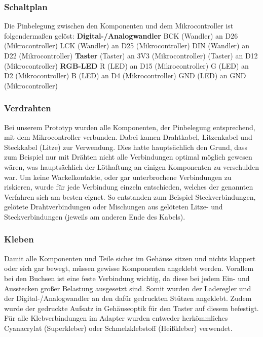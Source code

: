 \documentclass[]{article}
\begin{document}
\subsubsection{Schaltplan}
Die Pinbelegung zwischen den Komponenten und dem Mikrocontroller ist folgendermaßen gelöst:
\vspace{4mm}\newline
\textbf{Digital-/Analogwandler} \newline
BCK (Wandler) an D26 (Mikrocontroller)\newline
LCK (Wandler) an D25 (Mikrocontroller)\newline
DIN (Wandler) an D22 (Mikrocontroller)\newline
\vspace{4mm}\newline
\textbf{Taster}  (Taster) an 3V3 (Mikrocontroller) (Taster) an D12 (Mikrocontroller)\newline
\vspace{4mm}\newline
\textbf{RGB-LED} \newline
R (LED) an D15 (Mikrocontroller)\newline
G (LED) an D2 (Mikrocontroller)\newline
B (LED) an D4 (Mikrocontroller)\newline
GND (LED) an GND (Mikrocontroller)\newline
\subsubsection{Verdrahten}
Bei unserem Prototyp wurden alle Komponenten, der Pinbelegung entsprechend, mit dem Mikrocontroller verbunden. Dabei kamen Drahtkabel, Litzenkabel und Steckkabel (Litze) zur Verwendung. Dies hatte hauptsächlich den Grund, dass zum Beispiel nur mit Drähten nicht alle Verbindungen optimal möglich gewesen wären, was hauptsächlich der Löthaftung an einigen Komponenten zu verschulden war. Um keine Wackelkontakte, oder gar unterbrochene Verbindungen zu riskieren, wurde für jede Verbindung einzeln entschieden, welches der genannten Verfahren sich am besten eignet. So entstanden zum Beispiel Steckverbindungen, gelötete Drahtverbindungen oder Mischungen aus gelöteten Litze- und Steckverbindungen (jeweils am anderen Ende des Kabels).
\subsubsection{Kleben}
Damit alle Komponenten und Teile sicher im Gehäuse sitzen und nichts klappert oder sich gar bewegt, müssen gewisse Komponenten angeklebt werden. Vorallem bei den Buchsen ist eine feste Verbindung wichtig, da diese bei jedem Ein- und Ausstecken großer Belastung ausgesetzt sind. Somit wurden der Laderegler und der Digital-/Analogwandler an den dafür gedruckten Stützen angeklebt. Zudem wurde der gedruckte Aufsatz in Gehäuseoptik für den Taster auf diesem befestigt. Für alle Klebverbindungen im Adapter wurden entweder herkömmliches Cyanacrylat (Superkleber) oder Schmelzklebstoff (Heißkleber) verwendet.
\end{document}
